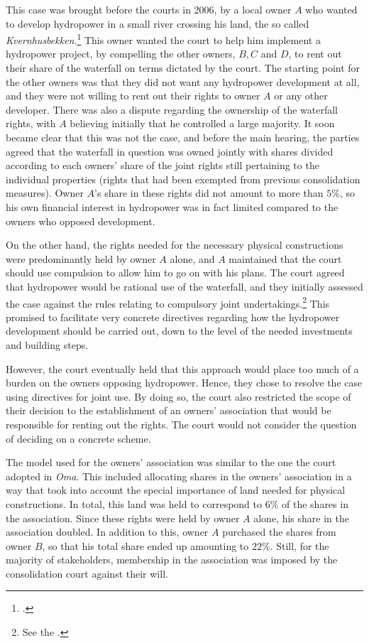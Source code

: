 This case was brought before the courts in 2006, by a local owner $A$ who wanted to develop hydropower in a small river crossing his land, the so called \emph{Kvernhusbekken}.\footcite{djonno06} This owner wanted the court to help him implement a hydropower project, by compelling the other owners, $B, C$ and $D$, to rent out their share of the waterfall on terms dictated by the court. The starting point for the other owners was that they did not want any hydropower development at all, and they were not willing to rent out their rights to owner $A$ or any other developer. There was also a dispute regarding the ownership of the waterfall rights, with $A$ believing initially that he controlled a large majority. It soon became clear that this was not the case, and before the main hearing, the parties agreed that the waterfall in question was owned jointly with shares divided according to each owners' share of the joint rights still pertaining to the individual properties (rights that had been exempted from previous consolidation measures). Owner $A$'s share in these rights did not amount to more than $5 \%$, so his own financial interest in hydropower was in fact limited compared to the owners who opposed development.

On the other hand, the rights needed for the necessary physical constructions were predominantly held by owner $A$ alone, and $A$ maintained that the court should use compulsion to allow him to go on with his plans. The court agreed that hydropower would be rational use of the waterfall, and they initially assessed the case against the rules relating to compulsory joint undertakings.\footnote{See the  \cite[2 e)]{lca79}.} This promised to facilitate very concrete directives regarding how the hydropower development should be carried out, down to the level of the needed investments and building steps. 

However, the court eventually held that this approach would place too much of a burden on the owners opposing hydropower. Hence, they chose to resolve the case using directives for joint use. By doing so, the court also restricted the scope of their decision to the establishment of an owners' association that would be responsible for renting out the rights. The court would not consider the question of deciding on a concrete scheme.

The model used for the owners' association was similar to the one the court adopted in \emph{Oma}. This included allocating shares in the owners' association in a way that took into account the special importance of land needed for physical constructions. In total, this land was held to correspond to $6 \%$ of the shares in the association. Since these rights were held by owner $A$ alone, his share in the association doubled. In addition to this, owner $A$ purchased the shares from owner $B$, so that his total share ended up amounting to $22 \%$. Still, for the majority of stakeholders, membership in the association was imposed by the consolidation court against their will.


